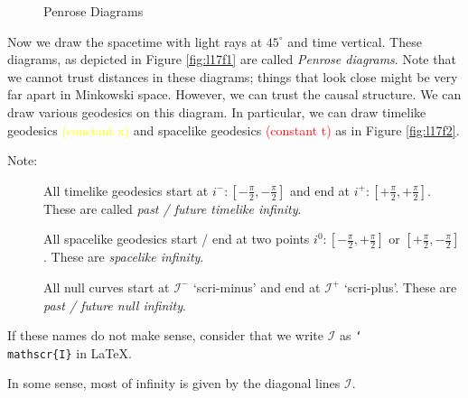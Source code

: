 \begin{figure}[tbhp]
  \centering
  \begin{minipage}[t]{0.5\columnwidth}
    \centering
    \def\svgwidth{0.9\textwidth}
    
    \caption{}
    \label{fig:l17f1}
  \end{minipage}%
  \begin{minipage}[t]{0.5\columnwidth}
    \centering
    \def\svgwidth{0.9\textwidth}
    
    \caption{}
    \label{fig:l17f2}
  \end{minipage}
  \caption{Penrose Diagrams}
  \label{fig:penrose-diagrams}
\end{figure}
Now we draw the spacetime with light rays at $45^\circ$ and time vertical. These diagrams, as depicted in Figure \ref{fig:l17f1} are called \emph{Penrose diagrams}.
Note that we cannot trust distances in these diagrams; things that look close might be very far apart in Minkowski space. However, we can trust the causal structure.
We can draw various geodesics on this diagram. 
In particular, we can draw timelike geodesics \textcolor{yellow}{(constant x)} %
and spacelike geodesics \textcolor{red}{(constant t)} %
as in Figure \ref{fig:l17f2}.
\begin{description}
  \item[Note:] All timelike geodesics start at $i^- \colon [- \frac{ \pi}{2}, - \frac{\pi}{2}]$ and end at $i^+ \colon [+ \frac{\pi}{2}, + \frac{\pi}{2}]$.
    These are called \emph{past / future timelike infinity}.
  \item[\bullet] All spacelike geodesics start / end at two points $i^0\colon [- \frac{\pi}{2}, + \frac{\pi}{2}]$ or $[+ \frac{\pi}{2}, - \frac{\pi}{2}]$. These are \emph{spacelike infinity}.
  \item[\bullet] All null curves start at $\mathscr{I}^-$ `scri-minus' and end at $\mathscr{I}^+$ `scri-plus'. These are \emph{past / future null infinity}.
\end{description}
\begin{leftbar}
  \begin{note}
    If these names do not make sense, consider that we write $\mathscr{I}$ as \texttt{\char`\\mathscr\{I\}} in \LaTeX.
  \end{note}
\end{leftbar}
\begin{leftbar}
  \begin{remark}
    In some sense, most of infinity is given by the diagonal lines $\mathscr{I}$.
  \end{remark}
\end{leftbar}

